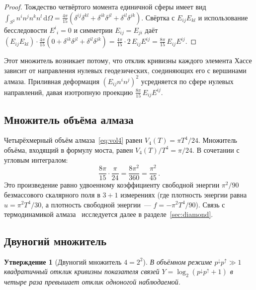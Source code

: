 \documentclass[12pt,a4paper]{article}
\theoremstyle{plain}
\newtheorem{proposition}[theorem]{Утверждение}
\theoremstyle{definition}
\theoremstyle{remark}
\newcommand{\dd}{\mathrm{d}}
\newcommand{\Esq}{E_{ij}E^{ij}}
\begin{document}
\begin{proof}
Тождество четвёртого момента единичной сферы имеет вид
$\int_{S^2} n^i n^j n^k n^l\,\dd\Omega
= \frac{4\pi}{15}(\delta^{ij}\delta^{kl} + \delta^{ik}\delta^{jl}
+ \delta^{il}\delta^{jk})$.
Свёртка с $E_{ij}E_{kl}$ и использование бесследовости
$E^i{}_i = 0$ и симметрии $E_{ij} = E_{ji}$ даёт
$(E_{ij}E_{kl}) \cdot \frac{4\pi}{15}
(0 + \delta^{ik}\delta^{jl} + \delta^{il}\delta^{jk})
= \frac{4\pi}{15} \cdot 2\, \Esq = \frac{8\pi}{15}\, \Esq$.
\end{proof}

Этот множитель возникает потому, что отклик кривизны каждого
элемента Хассе зависит от направления нулевых геодезических,
соединяющих его с вершинами алмаза.  Приливная деформация
$(E_{ij} n^i n^j)^2$ усредняется по сфере нулевых
направлений, давая изотропную проекцию
$\frac{8\pi}{15}\, \Esq$.

\subsection{Множитель объёма алмаза}
\label{sec:volume}

Четырёхмерный объём алмаза~\eqref{eq:vol4} равен
$V_4(T) = \pi T^4/24$.  Множитель объёма, входящий в
формулу моста, равен $V_4(T)/T^4 = \pi/24$.  В сочетании
с угловым интегралом:
\begin{equation}\label{eq:angvol}
  \frac{8\pi}{15} \cdot \frac{\pi}{24}
  = \frac{8\pi^2}{360} = \frac{\pi^2}{45}\,.
\end{equation}
Это произведение равно удвоенному коэффициенту свободной
энергии $\pi^2/90$ безмассового скалярного поля в $3{+}1$
измерениях (где плотность энергии равна
$u = \pi^2 T^4/30$, а плотность свободной энергии~---
$f = -\pi^2 T^4/90$).  Связь с термодинамикой
алмаза~\cite{MartRov:2003} исследуется далее в
разделе~\ref{sec:diamond}.

\subsection{Двуногий множитель}
\label{sec:factor4}

\begin{proposition}[Двуногий множитель $4 = 2^2$]
\label{prop:factor4}
В объёмном режиме $p^{\downarrow} p^{\uparrow} \gg 1$
квадратичный отклик кривизны показателя связей
$Y = \log_2(p^{\downarrow} p^{\uparrow} + 1)$ в четыре раза
превышает отклик одноногой наблюдаемой.
\end{proposition}
\end{document}
